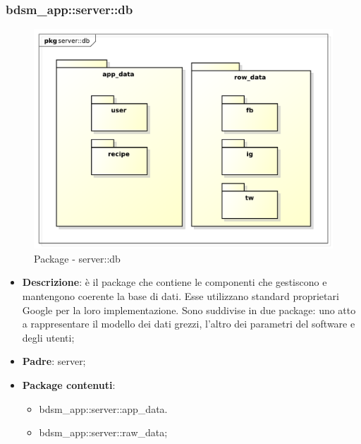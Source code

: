 

\subsubsection{bdsm\_app::server::db} %
\label{ssub:bdsm_app_server_db}

	\begin{figure}[htbp]
		\centering
		\centerline{\includegraphics[scale=0.5]{./images/server/db.pdf}}
		\caption{Package - server::db}
	\end{figure}

	\begin{itemize}
		\item \textbf{Descrizione}: è il package che contiene le componenti che gestiscono e mantengono coerente la base di dati. Esse utilizzano standard proprietari Google per la loro implementazione. Sono suddivise in due package: uno atto a rappresentare il modello dei dati grezzi, l'altro dei parametri del software e degli utenti;
		\item \textbf{Padre}: server;
		\item \textbf{Package contenuti}:
			\begin{itemize}
				\item bdsm\_app::server::app\_data.
				\item bdsm\_app::server::raw\_data;
			\end{itemize}
	\end{itemize}



